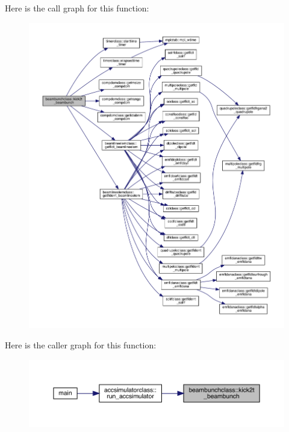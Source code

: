 Here is the call graph for this function\+:\nopagebreak
\begin{figure}[H]
\begin{center}
\leavevmode
\includegraphics[width=350pt]{namespacebeambunchclass_a13904891d2d14b332c4178871e861363_cgraph}
\end{center}
\end{figure}
Here is the caller graph for this function\+:\nopagebreak
\begin{figure}[H]
\begin{center}
\leavevmode
\includegraphics[width=350pt]{namespacebeambunchclass_a13904891d2d14b332c4178871e861363_icgraph}
\end{center}
\end{figure}
\mbox{\label{namespacebeambunchclass_a38583f97e581a51940801aeb0f8398a0}} 
